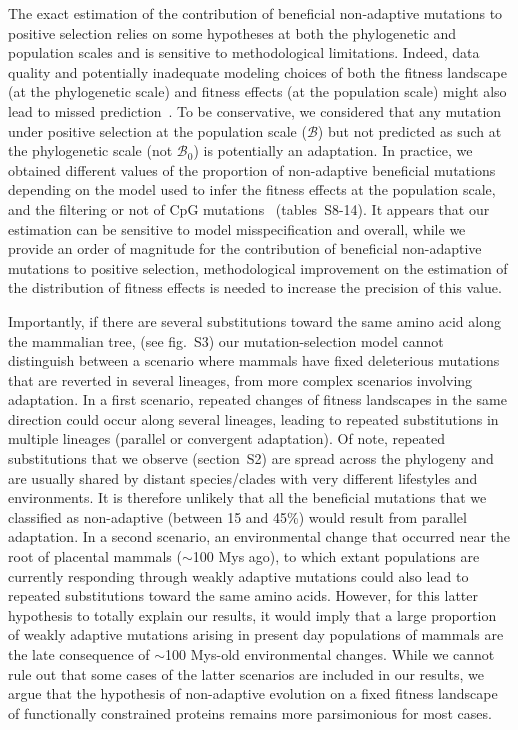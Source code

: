 \documentclass{article}
\newcommand{\SphyBen}{\mathcal{B}_0}
\newcommand{\SpopBen}{\mathcal{B}}
\begin{document}
    The exact estimation of the contribution of beneficial non-adaptive mutations to positive selection relies on some hypotheses at both the phylogenetic and population scales and is sensitive to methodological limitations.
    Indeed, data quality and potentially inadequate modeling choices of both the fitness landscape (at the phylogenetic scale) and fitness effects (at the population scale) might also lead to missed prediction~\cite{moutinho_variation_2019}.
    To be conservative, we considered that any mutation under positive selection at the population scale ($\SpopBen$) but not predicted as such at the phylogenetic scale (not $\SphyBen$) is potentially an adaptation.
    In practice, we obtained different values of the proportion of non-adaptive beneficial mutations depending on the model used to infer the fitness effects at the population scale, and the filtering or not of CpG mutations~\cite{eyre-walker_how_2014} (tables~S8-14).
    It appears that our estimation can be sensitive to model misspecification and overall, while we provide an order of magnitude for the contribution of beneficial non-adaptive mutations to positive selection, methodological improvement on the estimation of the distribution of fitness effects is needed to increase the precision of this value.

    Importantly, if there are several substitutions toward the same amino acid along the mammalian tree, (see fig.~S3) our mutation-selection model cannot distinguish between a scenario where mammals have fixed deleterious mutations that are reverted in several lineages, from more complex scenarios involving adaptation.
    In a first scenario, repeated changes of fitness landscapes in the same direction could occur along several lineages, leading to repeated substitutions in multiple lineages (parallel or convergent adaptation).
    Of note, repeated substitutions that we observe (section~S2) are spread across the phylogeny and are usually shared by distant species/clades with very different lifestyles and environments.
    It is therefore unlikely that all the beneficial mutations that we classified as non-adaptive (between 15 and 45\%) would result from parallel adaptation.
    In a second scenario, an environmental change that occurred near the root of placental mammals ($\sim$100 Mys ago), to which extant populations are currently responding through weakly adaptive mutations could also lead to repeated substitutions toward the same amino acids.
    However, for this latter hypothesis to totally explain our results, it would imply that a large proportion of weakly adaptive mutations arising in present day populations of mammals are the late consequence of $\sim$100 Mys-old environmental changes.
    While we cannot rule out that some cases of the latter scenarios are included in our results, we argue that the hypothesis of non-adaptive evolution on a fixed fitness landscape of functionally constrained proteins remains more parsimonious for most cases.
\end{document}
